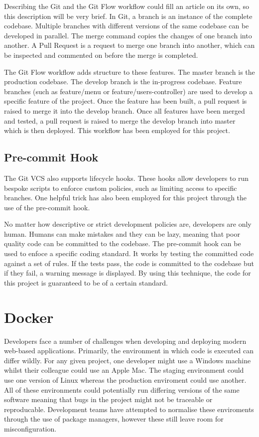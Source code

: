     Describing the Git and the Git Flow workflow could fill an article on its own, so this description will be very brief. In Git, a branch is an instance of the complete codebase. Multiple branches with different versions of the same codebase can be developed in parallel. The merge command copies the changes of one branch into another. A Pull Request is a request to merge one branch into another, which can be inspected and commented on before the merge is completed.

    The Git Flow workflow adds structure to these features. The master branch is the production codebase. The develop branch is the in-progress codebase. Feature branches (such as feature/menu or feature/users-controller) are used to develop a specific feature of the project. Once the feature has been built, a pull request is raised to merge it into the develop branch. Once all features have been merged and tested, a pull request is raised to merge the develop branch into master which is then deployed. This workflow has been employed for this project.

    \subsection{Pre-commit Hook}
    \label{section:pre-commit-hook}
      The Git VCS also supports lifecycle hooks. These hooks allow developers to run bespoke scripts to enforce custom policies, such as limiting access to specific branches. One helpful trick has also been employed for this project through the use of the pre-commit hook.

      No matter how descriptive or strict development policies are, developers are only human. Humans can make mistakes and they can be lazy, meaning that poor quality code can be committed to the codebase. The pre-commit hook can be used to enfoce a specific coding standard. It works by testing the committed code against a set of rules. If the tests pass, the code is committed to the codebase but if they fail, a warning message is displayed. By using this technique, the code for this project is guaranteed to be of a certain standard.

  \section{Docker}
    Developers face a number of challenges when developing and deploying modern web-based applications. Primarily, the environment in which code is executed can differ wildly. For any given project, one developer might use a Windows machine whilst their colleague could use an Apple Mac. The staging environment could use one version of Linux whereas the production enviroment could use another. All of these environments could potentially run differing versions of the same software meaning that bugs in the project might not be traceable or reproducable. Development teams have attempted to normalise these enviroments through the use of package managers, however these still leave room for misconfiguration.

